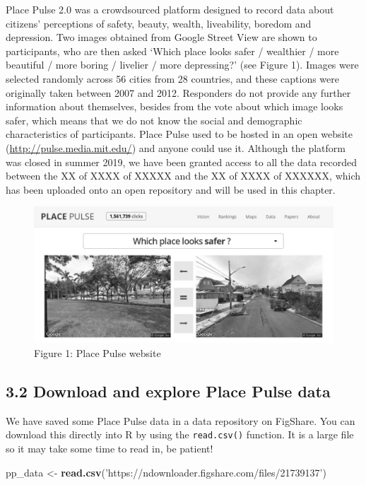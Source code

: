 \documentclass[
]{article}
\newenvironment{Shaded}{\begin{snugshade}}{\end{snugshade}}
\newcommand{\KeywordTok}[1]{\textcolor[rgb]{0.13,0.29,0.53}{\textbf{#1}}}
\newcommand{\NormalTok}[1]{#1}
\newcommand{\StringTok}[1]{\textcolor[rgb]{0.31,0.60,0.02}{#1}}
\begin{document}
Place Pulse 2.0 was a crowdsourced platform designed to record data
about citizens' perceptions of safety, beauty, wealth, liveability,
boredom and depression. Two images obtained from Google Street View are
shown to participants, who are then asked `Which place looks safer /
wealthier / more beautiful / more boring / livelier / more depressing?'
(see Figure 1). Images were selected randomly across 56 cities from 28
countries, and these captions were originally taken between 2007 and
2012. Responders do not provide any further information about
themselves, besides from the vote about which image looks safer, which
means that we do not know the social and demographic characteristics of
participants. Place Pulse used to be hosted in an open website
(\url{http://pulse.media.mit.edu/}) and anyone could use it. Although
the platform was closed in summer 2019, we have been granted access to
all the data recorded between the XX of XXXX of XXXXX and the XX of XXXX
of XXXXXX, which has been uploaded onto an open repository and will be
used in this chapter.

\begin{figure}
\centering
\includegraphics{figures/Place_Pulse.jpg}
\caption{Figure 1: Place Pulse website}
\end{figure}

\hypertarget{download-and-explore-place-pulse-data}{%
\subsection{3.2 Download and explore Place Pulse
data}\label{download-and-explore-place-pulse-data}}

We have saved some Place Pulse data in a data repository on FigShare.
You can download this directly into R by using the \texttt{read.csv()}
function. It is a large file so it may take some time to read in, be
patient!

\begin{Shaded}
\begin{Highlighting}[]
\NormalTok{pp_data <-}\StringTok{ }\KeywordTok{read.csv}\NormalTok{(}\StringTok{'https://ndownloader.figshare.com/files/21739137'}\NormalTok{) }
\end{Highlighting}
\end{Shaded}
\end{document}
